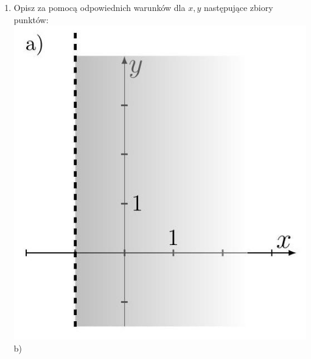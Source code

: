 \documentclass[10pt]{article}
\begin{document}
\begin{enumerate}
(33) \(\left\{\begin{array}{l}|x|>3 \\ |y|>1\end{array}\right.\)\\
(34) \(\left\{\begin{array}{l}y=|x| \\ |x|<2 \\ y>1\end{array}\right.\)\\
(35) \(\left\{\begin{array}{l}y>|x| \\ |x| \geqslant 1\end{array}\right.\)
  \item Opisz za pomocą odpowiednich warunków dla \(x, y\) następujące zbiory punktów:\\
\includegraphics[max width=\textwidth, center]{2024_11_21_8f01584889ff06348ae7g-068(3)}\\
b)\\

\end{enumerate}
\end{document}
